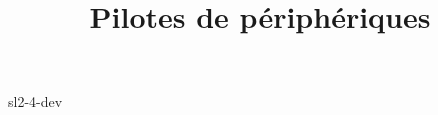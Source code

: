 \documentclass {beamer}
\title {Pilotes de périphériques}
\begin{document}
 {sl2-4-dev}
\end{document}
